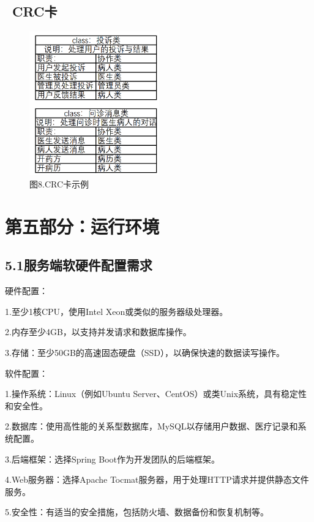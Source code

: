 \documentclass[24pt,a4paper]{article}%
\begin{document}
\subsection*{\ CRC卡}
\begin{figure}[H]
    \centering
    \includegraphics[width=0.5\textwidth]{images/CRCCard.png}
    \caption*{图8.CRC卡示例}
\end{figure}
\newpage

\section*{\songti 第五部分：运行环境}
\subsection*{\songti 5.1服务端软硬件配置需求}
\noindent 硬件配置：\par
1.至少1核CPU，使用Intel Xeon或类似的服务器级处理器。\par
2.内存至少4GB，以支持并发请求和数据库操作。\par
3.存储：至少50GB的高速固态硬盘（SSD），以确保快速的数据读写操作。\par
\noindent  软件配置：\par
1.操作系统：Linux（例如Ubuntu Server、CentOS）或类Unix系统，具有稳定性和安全性。\par
2.数据库：使用高性能的关系型数据库，MySQL以存储用户数据、医疗记录和系统配置。\par
3.后端框架：选择Spring Boot作为开发团队的后端框架。\par
4.Web服务器：选择Apache Tocmat服务器，用于处理HTTP请求并提供静态文件服务。\par
5.安全性：有适当的安全措施，包括防火墙、数据备份和恢复机制等。
\end{document}
